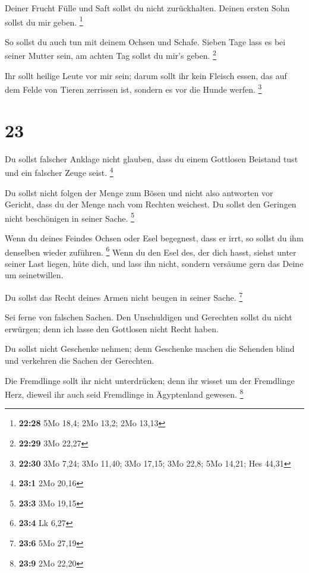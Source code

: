  Deiner Frucht Fülle und Saft sollst du nicht
zurückhalten. Deinen ersten Sohn sollst du mir geben. \footnote{\textbf{22:28}
  5Mo 18,4; 2Mo 13,2; 2Mo 13,13}

 So sollst du auch tun mit deinem Ochsen und Schafe.
Sieben Tage lass es bei seiner Mutter sein, am achten Tag sollst du
mir's geben. \footnote{\textbf{22:29} 3Mo 22,27}

 Ihr sollt heilige Leute vor mir sein; darum sollt ihr
kein Fleisch essen, das auf dem Felde von Tieren zerrissen ist, sondern
es vor die Hunde werfen. \footnote{\textbf{22:30} 3Mo 7,24; 3Mo 11,40;
  3Mo 17,15; 3Mo 22,8; 5Mo 14,21; Hes 44,31}

\hypertarget{section-4}{%
\section{23}\label{section-4}}

 Du sollst falscher Anklage nicht glauben, dass du einem
Gottlosen Beistand tust und ein falscher Zeuge seist. \footnote{\textbf{23:1}
  2Mo 20,16}

 Du sollst nicht folgen der Menge zum Bösen und nicht also
antworten vor Gericht, dass du der Menge nach vom Rechten weichest.
 Du sollst den Geringen nicht beschönigen in seiner Sache.
\footnote{\textbf{23:3} 3Mo 19,15}

 Wenn du deines Feindes Ochsen oder Esel begegnest, dass
er irrt, so sollst du ihm denselben wieder zuführen. \footnote{\textbf{23:4}
  Lk 6,27}  Wenn du den Esel des, der dich hasst, siehst
unter seiner Last liegen, hüte dich, und lass ihn nicht, sondern
versäume gern das Deine um seinetwillen.

 Du sollst das Recht deines Armen nicht beugen in seiner
Sache. \footnote{\textbf{23:6} 5Mo 27,19}

 Sei ferne von falschen Sachen. Den Unschuldigen und
Gerechten sollst du nicht erwürgen; denn ich lasse den Gottlosen nicht
Recht haben.

 Du sollst nicht Geschenke nehmen; denn Geschenke machen
die Sehenden blind und verkehren die Sachen der Gerechten.

 Die Fremdlinge sollt ihr nicht unterdrücken; denn ihr
wisset um der Fremdlinge Herz, dieweil ihr auch seid Fremdlinge in
Ägyptenland gewesen. \footnote{\textbf{23:9} 2Mo 22,20}

